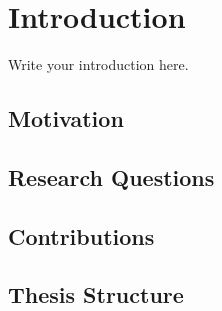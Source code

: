 \chapter{Introduction}
\label{ch:introduction}

Write your introduction here.

\section{Motivation}
\label{sec:motivation}

\section{Research Questions}
\label{sec:research-questions}

\section{Contributions}
\label{sec:contributions}

\section{Thesis Structure}
\label{sec:structure}
